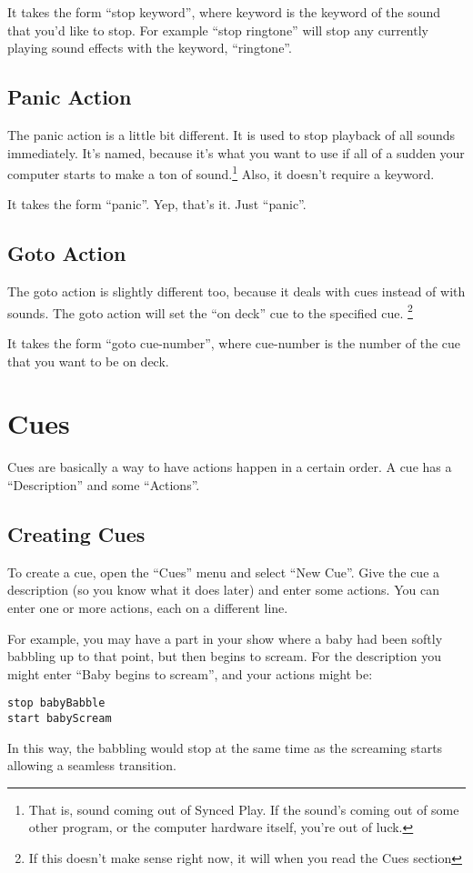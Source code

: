 \documentclass{article}
\begin{document}
It takes the form ``stop keyword'', where keyword is the keyword of the 
sound that you'd like to stop. For example ``stop ringtone'' will
stop any currently playing sound effects with the keyword, ``ringtone''.

\subsection{Panic Action}

The panic action is a little bit different. It is used to stop playback
of all sounds immediately. It's named, because it's what you want to use
if all of a sudden your computer starts to make a ton of sound.\footnote{
That is, sound coming out of Synced Play. If the sound's coming out of some
other program, or the computer hardware itself, you're out of luck.} Also,
it doesn't require a keyword.

It takes the form ``panic''. Yep, that's it. Just ``panic''.

\subsection{Goto Action}

The goto action is slightly different too, because it deals with cues
instead of with sounds. The goto action will set the ``on deck'' cue to
the specified cue. \footnote{If this doesn't make sense right now, it will
when you read the Cues section}

It takes the form ``goto cue-number'', where cue-number is the number of the
cue that you want to be on deck.

\newpage

\section{Cues}

Cues are basically a way to have actions happen in a certain order. A cue
has a ``Description'' and some ``Actions''. 

\subsection{Creating Cues}

To create a cue, open the ``Cues'' menu and select ``New Cue''. Give the cue
a description (so you know what it does later) and enter some actions. You
can enter one or more actions, each on a different line.

For example, you may have a part in your show where a baby had been softly
babbling up to that point, but then begins to scream. For the description
you might enter ``Baby begins to scream'', and your actions might be:
\begin{verbatim}
stop babyBabble
start babyScream
\end{verbatim}
In this way, the babbling would stop at the same time as the screaming
starts allowing a seamless transition.
\end{document}
